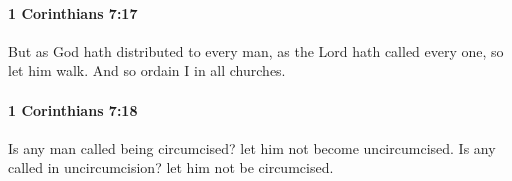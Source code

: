 		\paragraph{1 Corinthians 7:17} %
			\label{1CORINTHIANS-7-17}

			But as God hath distributed to every man, as the Lord hath called every one, so let him walk.  And so ordain I in all churches.

			\begin{framed}
			\scriptsize
				\begin{compactdesc}
					\item[SBLG] 
				\end{compactdesc}
			\end{framed}

		\paragraph{1 Corinthians 7:18} %
			\label{1CORINTHIANS-7-18}

			Is any man called being circumcised?  let him not become uncircumcised.  Is any called in uncircumcision?  let him not be circumcised.

